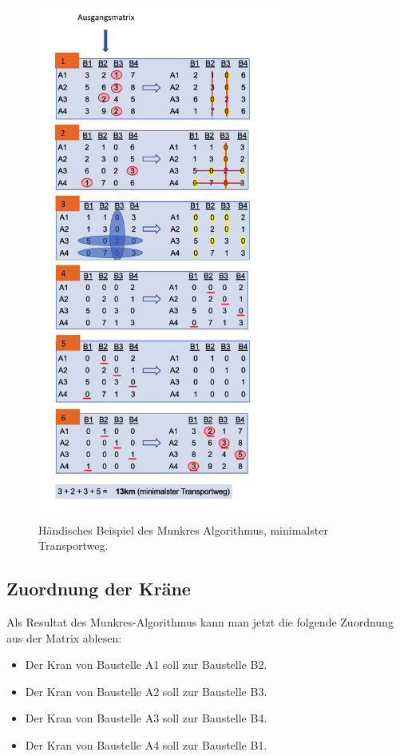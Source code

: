 \begin{figure}
\centering
\includegraphics[width=8cm]{papers/munkres/figures/Ungarische_Methode_Beispiel.png}
\caption{Händisches Beispiel des Munkres Algorithmus, minimalster Transportweg.}
\label{munkres:Vr2}
\end{figure}

\subsection{Zuordnung der Kräne
\label{munkres:subsection:malorum}}

Als Resultat des Munkres-Algorithmus kann man jetzt die folgende Zuordnung aus der Matrix ablesen:
\begin{itemize}
\item Der Kran von Baustelle A1 soll zur Baustelle B2.
\item Der Kran von Baustelle A2 soll zur Baustelle B3.
\item Der Kran von Baustelle A3 soll zur Baustelle B4.
\item Der Kran von Baustelle A4 soll zur Baustelle B1.
\end{itemize}

